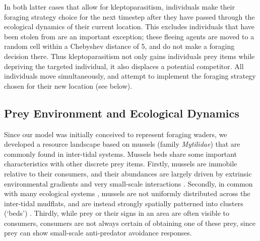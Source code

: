 \documentclass[11pt]{article}
\begin{document}
In both latter cases that allow for kleptoparasitism, individuals make their foraging strategy choice for the next timestep after they have passed through the ecological dynamics of their current location.
This excludes individuals that have been stolen from are an important exception; these fleeing agents are moved to a random cell within a Chebyshev distance of 5, and do not make a foraging decision there.
Thus kleptoparasitism not only gains individuals prey items while depriving the targeted individual, it also displaces a potential competitor.
All individuals move simultaneously, and attempt to implement the foraging strategy chosen for their new location (see below).

\subsection{Prey Environment and Ecological Dynamics}

Since our model was initially conceived to represent foraging waders, we developed a resource landscape based on mussels (family \textit{Mytilidae}) that are commonly found in inter-tidal systems.
Mussels beds share some important characteristics with other discrete prey items.
Firstly, mussels are immobile relative to their consumers, and their abundances are largely driven by extrinsic environmental gradients and very small-scale interactions \citep{dejager2020, dejager2011}.
Secondly, in common with many ecological systems \citep{levin1992}, mussels are not uniformly distributed across the inter-tidal mudflats, and are instead strongly spatially patterned into clusters (`beds') \citep{dejager2020, dejager2011}.
Thirdly, while prey or their signs in an area are often visible to consumers, consumers are not always certain of obtaining one of these prey, since prey can show small-scale anti-predator avoidance responses.
\end{document}
